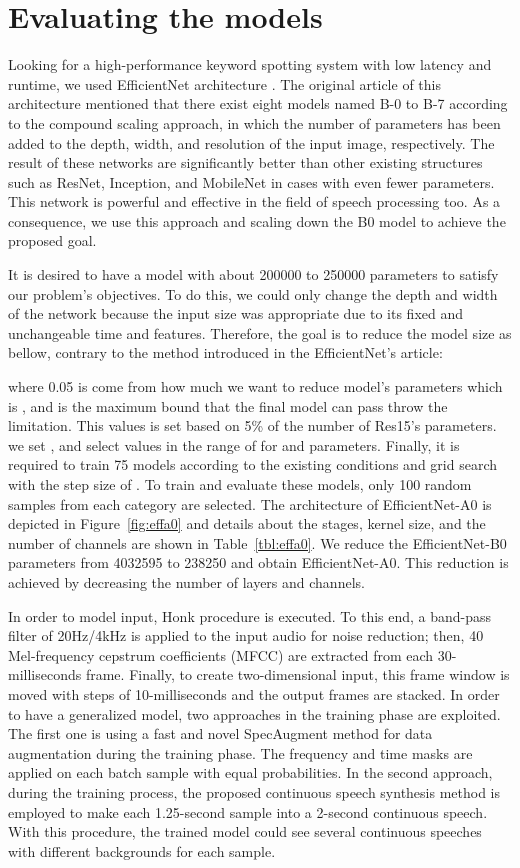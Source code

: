 \documentclass{article}
\begin{document}
\section{Evaluating the models}
Looking for a high-performance keyword spotting system with low latency and runtime, we used EfficientNet architecture \cite{eff}. The original article of this architecture mentioned that there exist eight models named B-0 to B-7 according to the compound scaling approach, in which the number of parameters has been added to the depth, width, and resolution of the input image, respectively. The result of these networks are significantly better than other existing structures such as ResNet, Inception, and MobileNet in cases with even fewer parameters. This network is powerful and effective in the field of speech processing too. As a consequence, we use this approach and scaling down the B0 model to achieve the proposed goal.

It is desired to have a model with about 200000 to 250000 parameters to satisfy our problem's objectives. To do this, we could only change the depth and width of the network because the input size was appropriate due to its fixed and unchangeable time and features. Therefore, the goal is to reduce the model size as bellow, contrary to the method introduced in the EfficientNet's article:

where 0.05 is come from how much we want to reduce model's parameters which is , and  is the maximum bound that the final model can pass throw the limitation. This values is set based on 5\% of the number of Res15's parameters. we set , and select values in the range of  for  and  parameters. Finally, it is required to train 75 models according to the existing conditions and grid search with the step size of . To train and evaluate these models, only 100 random samples from each category are selected.
The architecture of EfficientNet-A0 is depicted in Figure~\ref{fig:effa0} and details about the stages, kernel size, and the number of channels are shown in Table~\ref{tbl:effa0}. We reduce the EfficientNet-B0 parameters from 4032595 to 238250 and obtain EfficientNet-A0. This reduction is achieved by decreasing the number of layers and channels.


In order to model input, Honk \cite{cnnsmall} procedure is executed. To this end, a band-pass filter of 20Hz/4kHz is applied to the input audio for noise reduction; then, 40 Mel-frequency cepstrum coefficients (MFCC) are extracted from each 30-milliseconds frame. Finally, to create two-dimensional input, this frame window is moved with steps of 10-milliseconds and the output frames are stacked. In order to have a generalized model, two approaches in the training phase are exploited. The first one is using a fast and novel SpecAugment method \cite{specaug} for data augmentation during the training phase. The frequency and time masks are applied on each batch sample with equal probabilities. In the second approach, during the training process, the proposed continuous speech synthesis method is employed to make each 1.25-second sample into a 2-second continuous speech. With this procedure, the trained model could see several continuous speeches with different backgrounds for each sample.
\end{document}
